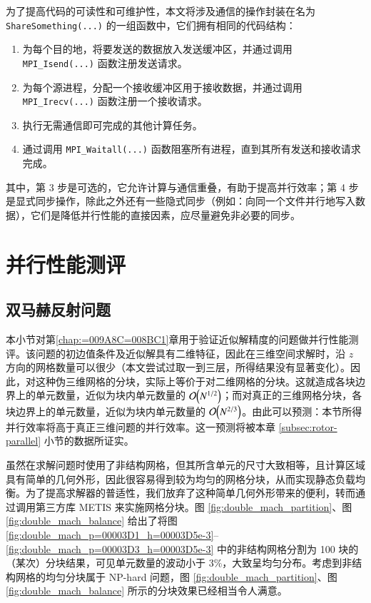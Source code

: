 为了提高代码的可读性和可维护性，本文将涉及通信的操作封装在名为 \texttt{ShareSomething(...)} 的一组函数中，它们拥有相同的代码结构：
\begin{enumerate}[wide]
\item 为每个目的地，将要发送的数据放入发送缓冲区，并通过调用 \texttt{MPI\_Isend(...)} 函数注册发送请求。
\item 为每个源进程，分配一个接收缓冲区用于接收数据，并通过调用 \texttt{MPI\_Irecv(...)} 函数注册一个接收请求。
\item 执行无需通信即可完成的其他计算任务。
\item 通过调用 \texttt{MPI\_Waitall(...)} 函数阻塞所有进程，直到其所有发送和接收请求完成。
\end{enumerate}
其中，第 3 步是可选的，它允许计算与通信重叠，有助于提高并行效率；第 4 步是显式同步操作，除此之外还有一些隐式同步（例如：向同一个文件并行地写入数据），它们是降低并行性能的直接因素，应尽量避免非必要的同步。

\section{并行性能测评}

\subsection{双马赫反射问题}

本小节对第\ref{chap:=009A8C=008BC1}章用于验证近似解精度的问题做并行性能测评。该问题的初边值条件及近似解具有二维特征，因此在三维空间求解时，沿
$z$ 方向的网格数量可以很少（本文尝试过取一到三层，所得结果没有显著变化）。因此，对这种伪三维网格的分块，实际上等价于对二维网格的分块。这就造成各块边界上的单元数量，近似为块内单元数量的
$\order{N^{1/2}}$；而对真正的三维网格分块，各块边界上的单元数量，近似为块内单元数量的 $\order{N^{2/3}}$。由此可以预测：本节所得并行效率将高于真正三维问题的并行效率。这一预测将被本章
\ref{subsec:rotor-parallel} 小节的数据所证实。

虽然在求解问题时使用了非结构网格，但其所含单元的尺寸大致相等，且计算区域具有简单的几何外形，因此很容易得到较为均匀的网格分块，从而实现静态负载均衡。为了提高求解器的普适性，我们放弃了这种简单几何外形带来的便利，转而通过调用第三方库
METIS 来实施网格分块。图 \ref{fig:double_mach_partition}、图
\ref{fig:double_mach_balance} 给出了将图 \ref{fig:double_mach_p=00003D1_h=00003D5e-3}–\ref{fig:double_mach_p=00003D3_h=00003D5e-3}
中的非结构网格分割为 100 块的（某次）分块结果，可见单元数量的波动小于 $3\%$，大致呈均匀分布。考虑到非结构网格的均匀分块属于
NP-hard 问题，图 \ref{fig:double_mach_partition}、图 \ref{fig:double_mach_balance}
所示的分块效果已经相当令人满意。

